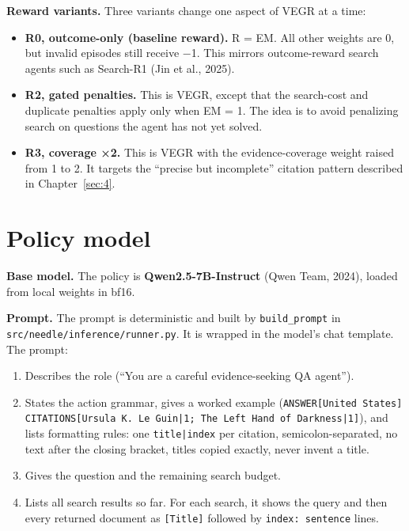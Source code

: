 \textbf{Reward variants.} Three variants change one aspect of VEGR at a
time:

\begin{itemize}
\tightlist
\item
  \textbf{R0, outcome-only (baseline reward).} R = EM. All other weights
  are 0, but invalid episodes still receive −1. This mirrors
  outcome-reward search agents such as Search-R1 (Jin et al., 2025).
\item
  \textbf{R2, gated penalties.} This is VEGR, except that the
  search-cost and duplicate penalties apply only when EM = 1. The idea
  is to avoid penalizing search on questions the agent has not yet
  solved.
\item
  \textbf{R3, coverage ×2.} This is VEGR with the evidence-coverage
  weight raised from 1 to 2. It targets the ``precise but incomplete''
  citation pattern described in Chapter~\ref{sec:4}.
\end{itemize}

\section{Policy model}\label{sec:3.5}

\textbf{Base model.} The policy is \textbf{Qwen2.5-7B-Instruct} (Qwen
Team, 2024), loaded from local weights in bf16.

\textbf{Prompt.} The prompt is deterministic and built by
\texttt{build\_\allowbreak{}prompt} in
\texttt{src/\allowbreak{}needle/\allowbreak{}inference/\allowbreak{}runner.\allowbreak{}py}.
It is wrapped in the model's chat template. The prompt:

\begin{enumerate}
\def\labelenumi{\arabic{enumi}.}
\tightlist
\item
  Describes the role (``You are a careful evidence-seeking QA agent'').
\item
  States the action grammar, gives a worked example
  (\texttt{ANSWER{[}United States{]} CITATIONS{[}Ursula K.\allowbreak{} Le Guin|1; The Left Hand of Darkness|1{]}}),
  and lists formatting rules: one \texttt{title|index} per citation,
  semicolon-separated, no text after the closing bracket, titles copied
  exactly, never invent a title.
\item
  Gives the question and the remaining search budget.
\item
  Lists all search results so far. For each search, it shows the query
  and then every returned document as \texttt{{[}Title{]}} followed by
  \texttt{index: sentence} lines.
\end{enumerate}

